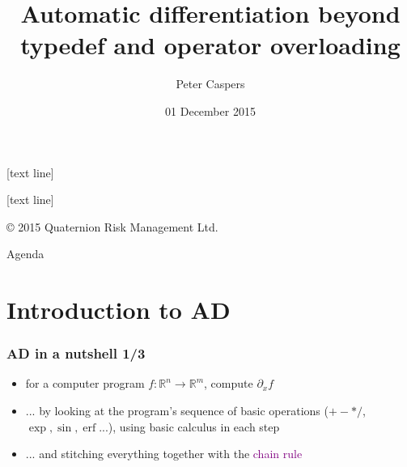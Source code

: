 \documentclass[10pt,German]{beamer}
\title{Automatic differentiation beyond typedef and operator overloading}
\author[QRM]{Peter Caspers}
\institute{\normalsize Quaternion Risk Management}
\date[Short Occasion]{\small 01 December 2015}
\begin{document}
[text line]{}
\begin{frame}
\vskip 3.5cm
{\bf
\titlepage
}
\end{frame}


[text line]{
\parbox{\linewidth}
{\color{white}
\selectfont
\vspace*{-6pt}\copyright{} 2015 Quaternion Risk Management Ltd. 
\hfill\insertauthor
\hfill\insertpagenumber}
}

\begin{frame}{Agenda}
\tableofcontents
\end{frame}


\section{Introduction to AD}

\begin{frame}[fragile]
\frametitle{AD in a nutshell 1/3}
\begin{itemize}
\item for a computer program $f:\mathbb{R}^n\rightarrow\mathbb{R}^m$, compute $\partial_{x} f$
\item $...$ by looking at the program's sequence of basic operations ($+-*/$, $\exp, \sin, \operatorname{erf} ...$), using basic calculus in each step
\item $...$ and stitching everything together with the \textcolor{purple}{chain rule}
\end{itemize}
\end{frame}
\end{document}
